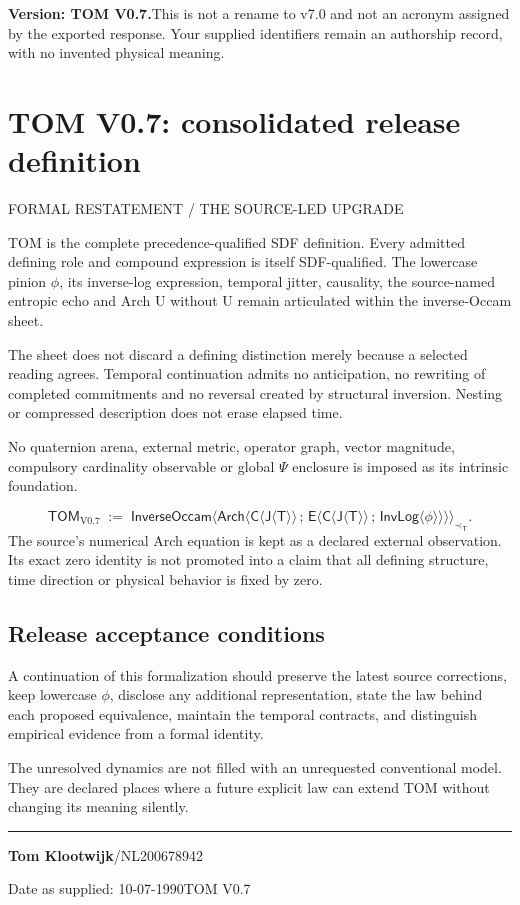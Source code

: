 \documentclass[11pt,a4paper]{article}
\newcommand{\newsec}[2]{\clearpage\section{#1}{\sffamily\footnotesize\color{teal}\MakeUppercase{#2}\par}\vspace{5pt}}
\newcommand{\Tom}{\mathsf{TOM}}
\newcommand{\Ti}{\mathsf T}
\newcommand{\Ji}{\mathsf J}
\newcommand{\Ca}{\mathsf C}
\newcommand{\En}{\mathsf E}
\newcommand{\IL}{\mathsf{InvLog}}
\newcommand{\IO}{\mathsf{InverseOccam}}
\newcommand{\Ar}{\mathsf{Arch}}
\newcommand{\bind}[1]{\langle #1\rangle}
\begin{document}
\begin{boxx}
\textbf{Version: TOM V0.7.}\quad This is not a rename to v7.0 and not an acronym assigned by the exported response. Your supplied identifiers remain an authorship record, with no invented physical meaning.
\end{boxx}

\newsec{TOM V0.7: consolidated release definition}{Formal restatement / the source-led upgrade}
\begin{boxx}[TOM]
TOM is the complete precedence-qualified SDF definition. Every admitted defining role and compound expression is itself SDF-qualified. The lowercase pinion $\phi$, its inverse-log expression, temporal jitter, causality, the source-named entropic echo and Arch U without U remain articulated within the inverse-Occam sheet.

The sheet does not discard a defining distinction merely because a selected reading agrees. Temporal continuation admits no anticipation, no rewriting of completed commitments and no reversal created by structural inversion. Nesting or compressed description does not erase elapsed time.

No quaternion arena, external metric, operator graph, vector magnitude, compulsory cardinality observable or global $\Psi$ enclosure is imposed as its intrinsic foundation.
\end{boxx}
\[
 \boxed{\Tom_{\mathrm{V0.7}}\;:=\;
 \IO\bind{\Ar\bind{\Ca\bind{\Ji\bind{\Ti}}\,;\,
 \En\bind{\Ca\bind{\Ji\bind{\Ti}}\,;\,\IL\bind{\phi}}}}_{\prec_{\Ti}}.}
\]
The source's numerical Arch equation is kept as a declared external observation. Its exact zero identity is not promoted into a claim that all defining structure, time direction or physical behavior is fixed by zero.

\subsection{Release acceptance conditions}
A continuation of this formalization should preserve the latest source corrections, keep lowercase $\phi$, disclose any additional representation, state the law behind each proposed equivalence, maintain the temporal contracts, and distinguish empirical evidence from a formal identity.

The unresolved dynamics are not filled with an unrequested conventional model. They are declared places where a future explicit law can extend TOM without changing its meaning silently.

\vfill
{\color{teal}\rule{\linewidth}{.6pt}}\par
{\sffamily\color{ink}\textbf{Tom Klootwijk}\quad /\quad NL200678942}\par
{\sffamily\small\color{muted}Date as supplied: 10-07-1990\hfill TOM V0.7}
\end{document}
